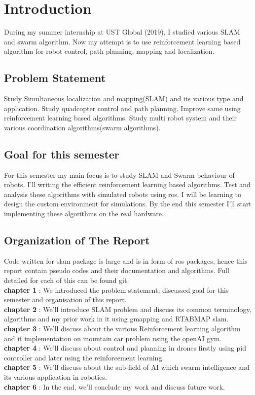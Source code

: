 \chapter{Introduction}
\hspace{3mm}

During my summer internship at UST Global (2019), I studied various SLAM and swarm algorithm. Now my attempt is to use reinforcement learning based algorithm for robot control, path planning, mapping and localization.

\section{Problem Statement}
Study Simultaneous localization and mapping(SLAM) and its various type and application. Study quadcopter control and path planning. Improve same using reinforcement learning based algorithms. Study multi robot system and their various coordination algorithms(swarm algorithms).

\section{Goal for this semester}

For this semester my main focus is to study SLAM and Swarm behaviour of robots. I'll writing the efficient reinforcement learning based algorithms. Test and analysis these algorithms with simulated robots using ros. I will be learning to design the custom environment for simulations. By the end this semester I'll start implementing these algorithms on the real hardware.

\section{Organization of The Report}

Code written for slam package is large and is in form of ros packages, hence this report contain pseudo codes and their documentation and algorithms. Full detailed for each of this can be found git.\cite{btpgit}
\\
\textbf{chapter 1} : We introduced the problem statement, discussed goal for this semester and organisation of this report.
\\
\textbf{chapter 2} : We'll introduce SLAM problem and discuss its common terminology, algorithms and my prior work in it using gmapping and RTABMAP slam. 
\\
\textbf{chapter 3} : We'll discuss about the various Reinforcement learning algorithm and it implementation on mountain car problem using the openAI gym.
\\
\textbf{chapter 4} : We'll discuss about control and planning in drones firstly using pid controller and later using the reinforcement learning.
\\
\textbf{chapter 5} : We'll discuss about the sub-field of AI which swarm intelligence and its various application in robotics.
\\
\textbf{chapter 6} : In the end, we'll conclude my work and discuss future work.


